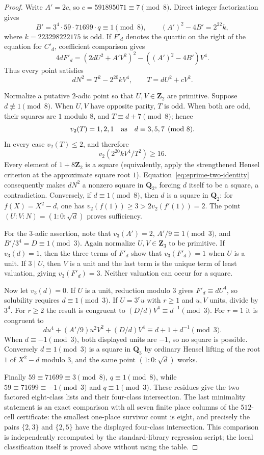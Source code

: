 \documentclass[11pt]{article}
\begin{document}
\begin{proof}
Write $A'=2c$, so $c=591895071\equiv7\pmod8$.  Direct integer
factorization gives
\[
 B'=3^4\cdot59\cdot71699\cdot q\equiv1\pmod8,
 \qquad (A')^2-4B'=2^{22}k,
\]
where $k=223298222175$ is odd.  If $F'_d$ denotes the quartic on the
right of the equation for $C'_d$, coefficient comparison gives
\[
 4dF'_d=(2dU^2+A'V^2)^2-((A')^2-4B')V^4.
\]
Thus every point satisfies
\begin{equation}\label{eq:eprime-two-identity}
 dN^2=T^2-2^{20}kV^4,\qquad T=dU^2+cV^2.
\end{equation}

Normalize a putative $2$-adic point so that $U,V\in\mathbf Z_2$ are
primitive.  Suppose $d\not\equiv1\pmod8$.  When $U,V$ have opposite
parity, $T$ is odd.  When both are odd, their squares are $1$ modulo $8$,
and $T\equiv d+7\pmod8$; hence
\[
 v_2(T)=1,2,1\quad\hbox{as}\quad d\equiv3,5,7\pmod8.
\]
In every case $v_2(T)\le2$, and therefore
\[
 v_2\left(2^{20}kV^4/T^2\right)\ge16.
\]
Every element of $1+8\mathbf Z_2$ is a square (equivalently, apply the
strengthened Hensel criterion at the approximate square root $1$).
Equation~\eqref{eq:eprime-two-identity} consequently makes $dN^2$ a
nonzero square in $\mathbf Q_2$, forcing $d$ itself to be a square, a
contradiction.  Conversely, if $d\equiv1\pmod8$, then $d$ is a square in
$\mathbf Q_2$: for $f(X)=X^2-d$, one has
$v_2(f(1))\ge3>2v_2(f'(1))=2$.  The point
$(U:V:N)=(1:0:\sqrt d)$ proves sufficiency.

For the $3$-adic assertion, note that $v_3(A')=2$,
$A'/9\equiv1\pmod3$, and $B'/3^4=D\equiv1\pmod3$.  Again normalize
$U,V\in\mathbf Z_3$ to be primitive.  If $v_3(d)=1$, then the three
terms of $F'_d$ show that $v_3(F'_d)=1$ when $U$ is a unit.  If $3\mid U$,
then $V$ is a unit and the last term is the unique term of least valuation,
giving $v_3(F'_d)=3$.  Neither valuation can occur for a square.

Now let $v_3(d)=0$.  If $U$ is a unit, reduction modulo $3$ gives
$F'_d\equiv dU^4$, so solubility requires $d\equiv1\pmod3$.  If
$U=3^ru$ with $r\ge1$ and $u,V$ units, divide by $3^4$.  For $r\ge2$ the
result is congruent to $(D/d)V^4\equiv d^{-1}\pmod3$.  For $r=1$ it is
congruent to
\[
 du^4+(A'/9)u^2V^2+(D/d)V^4\equiv d+1+d^{-1}\pmod3.
\]
When $d\equiv-1\pmod3$, both displayed units are $-1$, so no square is
possible.  Conversely $d\equiv1\pmod3$ is a square in $\mathbf Q_3$ by
ordinary Hensel lifting of the root $1$ of $X^2-d$ modulo $3$, and the
same point $(1:0:\sqrt d)$ works.

Finally $59\equiv71699\equiv3\pmod8$, $q\equiv1\pmod8$, while
$59\equiv71699\equiv-1\pmod3$ and $q\equiv1\pmod3$.  These residues give
the two factored eight-class lists and their four-class intersection.
The last minimality statement is an exact comparison with all seven finite
place columns of the $512$-cell certificate: the smallest one-place survivor
count is eight, and precisely the pairs $\{2,3\}$ and $\{2,5\}$ have the
displayed four-class intersection.  This comparison is independently
recomputed by the standard-library regression script; the local
classification itself is proved above without using the table.
\end{proof}
\end{document}

